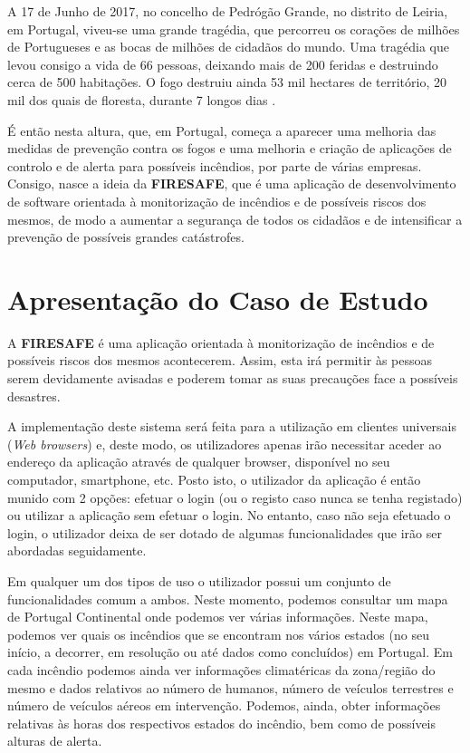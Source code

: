 \documentclass[a4paper,12pt]{scrreprt}
\newcommand{\tab}{
    \hspace{1cm}}
\begin{document}
        \tab A 17 de Junho de 2017, no concelho de Pedrógão Grande, no distrito de Leiria, em Portugal, viveu-se uma grande tragédia, que percorreu os corações de milhões de Portugueses e as bocas de milhões de cidadãos do mundo. Uma tragédia que levou consigo a vida de 66 pessoas, deixando mais de 200 feridas e destruindo cerca de 500 habitações. O fogo destruiu ainda 53 mil hectares de território, 20 mil dos quais de floresta, durante 7 longos dias \cite{incendio_pedrogao}.
        
        \tab É então nesta altura, que, em Portugal, começa a aparecer uma melhoria das medidas de prevenção contra os fogos e uma melhoria e criação de aplicações de controlo e de alerta para possíveis incêndios, por parte de várias empresas. Consigo, nasce a ideia da \textbf{FIRESAFE}, que é uma aplicação de desenvolvimento de software orientada à monitorização de incêndios e de possíveis riscos dos mesmos, de modo a aumentar a segurança de todos os cidadãos e de intensificar a prevenção de possíveis grandes catástrofes.
\clearpage
    \section{Apresentação do Caso de Estudo}
        \tab A \textbf{FIRESAFE} é uma aplicação orientada à monitorização de incêndios e de possíveis riscos dos mesmos acontecerem. Assim, esta irá permitir às pessoas serem devidamente avisadas e poderem tomar as suas precauções face a possíveis desastres.
        
        \tab A implementação deste sistema será feita para a utilização em clientes universais (\textit{Web browsers}) e, deste modo, os utilizadores apenas irão necessitar aceder ao endereço da aplicação através de qualquer browser, disponível no seu computador, smartphone, etc. Posto isto, o utilizador da aplicação é então munido com 2 opções: efetuar o login (ou o registo caso nunca se tenha registado) ou utilizar a aplicação sem efetuar o login. No entanto, caso não seja efetuado o login, o utilizador deixa de ser dotado de algumas funcionalidades que irão ser abordadas seguidamente.
        
        \tab Em qualquer um dos tipos de uso o utilizador possui um conjunto de funcionalidades comum a ambos. Neste momento, podemos consultar um mapa de Portugal Continental onde podemos ver várias informações. Neste mapa, podemos ver quais os incêndios que se encontram nos vários estados (no seu início, a decorrer, em resolução ou até dados como concluídos) em Portugal. Em cada incêndio podemos ainda ver informações climatéricas da zona/região do mesmo e dados relativos ao número de humanos, número de veículos terrestres e número de veículos aéreos em intervenção. Podemos, ainda, obter informações relativas às horas dos respectivos estados do incêndio, bem como de possíveis alturas de alerta.
        
\end{document}

